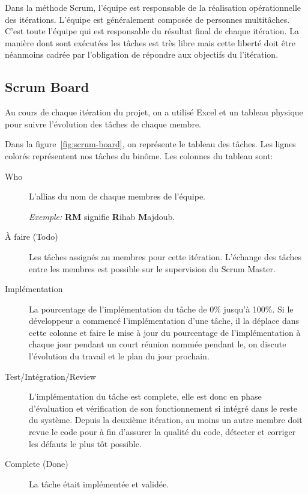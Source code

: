 Dans la méthode Scrum, l'équipe est responsable de la réalisation
opérationnelle des itérations. L'équipe est généralement composée de personnes
multitâches. C'est toute l'équipe qui est responsable du résultat final de
chaque itération. La manière dont sont exécutées les tâches est très libre mais
cette liberté doit être néanmoins cadrée par l'obligation de répondre aux
objectifs du l'itération.

\subsection{Scrum Board}

Au cours de chaque itération du projet, on a utilisé Excel et un tableau
physique pour suivre l'évolution des tâches de chaque membre.

Dans la figure~\ref{fig:scrum-board}, on représente le tableau des tâches. Les
lignes colorés représentent nos tâches du binôme. Les colonnes du tableau sont:

\begin{description}
    \item [Who] L'allias du nom de chaque membres de l'équipe.

        \emph{Exemple:} \textbf{RM} signifie \textbf{R}ihab \textbf{M}ajdoub.
    \item [À faire (Todo)] Les tâches assignés au membres pour cette itération.
        L'échange des tâches entre les membres est possible sur le supervision
        du Scrum Master.
    \item [Implémentation] La pourcentage de l'implémentation du tâche de 0\%
        jusqu'à 100\%. Si le développeur a commencé l'implémentation d'une
        tâche, il la déplace dans cette colonne et faire le mise à jour du
        pourcentage de l'implémentation à chaque jour pendant un court réunion
        nommée  pendant le, on discute l'évolution du
        travail et le plan du jour prochain.
    \item [Test/Intégration/Review] L'implémentation du tâche est complete,
        elle est donc en phase d'évaluation et vérification de son
        fonctionnement si intégré dans le reste du système. Depuis la deuxième
        itération, au moins un autre membre doit revue le code pour à fin
        d'assurer la qualité du code, détecter et corriger les défauts le plus
        tôt possible.
    \item [Complete (Done)] La tâche était implémentée et validée.
\end{description}

